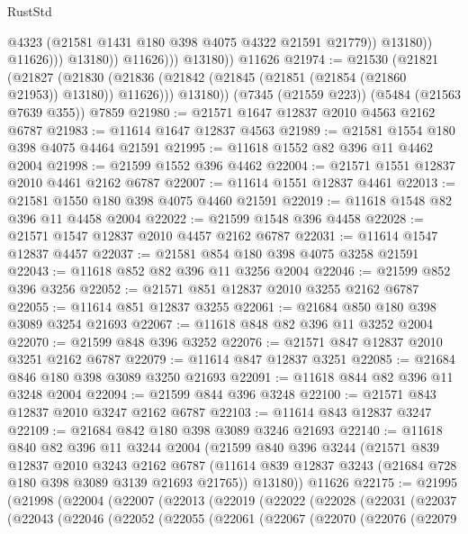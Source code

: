 \begin{lexlean}{RustStd}
\begin{coremodule}
{\begin{coremodule}
{{{{{{{{{{{{{{{{{{{{{{{{{{{{{{{                              @4323
                              (@21581 @1431 @180 @398 @4075 @4322 @21591 @21779))
                            @13180))
                        @11626)))
                  @13180))
              @11626)))
        @13180))
    @11626
@21974 := @21530
    (@21821
      (@21827
        (@21830 (@21836 (@21842 (@21845 (@21851 (@21854 (@21860 @21953)) @13180)) @11626)))
        @13180))
    (@7345 (@21559 @223))
    (@5484 (@21563 @7639 @355))
    @7859
@21980 := @21571 @1647 @12837 @2010 @4563 @2162 @6787
@21983 := @11614 @1647 @12837 @4563
@21989 := @21581 @1554 @180 @398 @4075 @4464 @21591
@21995 := @11618 @1552 @82 @396 @11 @4462 @2004
@21998 := @21599 @1552 @396 @4462
@22004 := @21571 @1551 @12837 @2010 @4461 @2162 @6787
@22007 := @11614 @1551 @12837 @4461
@22013 := @21581 @1550 @180 @398 @4075 @4460 @21591
@22019 := @11618 @1548 @82 @396 @11 @4458 @2004
@22022 := @21599 @1548 @396 @4458
@22028 := @21571 @1547 @12837 @2010 @4457 @2162 @6787
@22031 := @11614 @1547 @12837 @4457
@22037 := @21581 @854 @180 @398 @4075 @3258 @21591
@22043 := @11618 @852 @82 @396 @11 @3256 @2004
@22046 := @21599 @852 @396 @3256
@22052 := @21571 @851 @12837 @2010 @3255 @2162 @6787
@22055 := @11614 @851 @12837 @3255
@22061 := @21684 @850 @180 @398 @3089 @3254 @21693
@22067 := @11618 @848 @82 @396 @11 @3252 @2004
@22070 := @21599 @848 @396 @3252
@22076 := @21571 @847 @12837 @2010 @3251 @2162 @6787
@22079 := @11614 @847 @12837 @3251
@22085 := @21684 @846 @180 @398 @3089 @3250 @21693
@22091 := @11618 @844 @82 @396 @11 @3248 @2004
@22094 := @21599 @844 @396 @3248
@22100 := @21571 @843 @12837 @2010 @3247 @2162 @6787
@22103 := @11614 @843 @12837 @3247
@22109 := @21684 @842 @180 @398 @3089 @3246 @21693
@22140 := @11618
    @840
    @82
    @396
    @11
    @3244
    @2004
    (@21599
      @840
      @396
      @3244
      (@21571
        @839
        @12837
        @2010
        @3243
        @2162
        @6787
        (@11614 @839 @12837 @3243 (@21684 @728 @180 @398 @3089 @3139 @21693 @21765))
        @13180))
    @11626
@22175 := @21995
    (@21998
      (@22004
        (@22007
          (@22013
            (@22019
              (@22022
                (@22028
                  (@22031
                    (@22037
                      (@22043
                        (@22046
                          (@22052
                            (@22055
                              (@22061
                                (@22067
                                  (@22070
                                    (@22076
                                      (@22079
}}}}}}}}}}}}}}}}}}}}}}}}}}}}}}}
\end{coremodule}}
\end{coremodule}
\end{lexlean}
